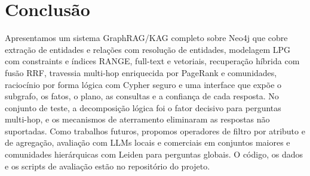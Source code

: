 \documentclass[12pt]{article}
\begin{document}
\section{Conclusão}

Apresentamos um sistema GraphRAG/KAG completo sobre Neo4j que cobre extração de entidades e relações com resolução de entidades, modelagem LPG com constraints e índices RANGE, full-text e vetoriais, recuperação híbrida com fusão RRF, travessia multi-hop enriquecida por PageRank e comunidades, raciocínio por forma lógica com Cypher seguro e uma interface que expõe o subgrafo, os fatos, o plano, as consultas e a confiança de cada resposta. No conjunto de teste, a decomposição lógica foi o fator decisivo para perguntas multi-hop, e os mecanismos de aterramento eliminaram as respostas não suportadas. Como trabalhos futuros, propomos operadores de filtro por atributo e de agregação, avaliação com LLMs locais e comerciais em conjuntos maiores e comunidades hierárquicas com Leiden para perguntas globais. O código, os dados e os scripts de avaliação estão no repositório do projeto.



\end{document}
